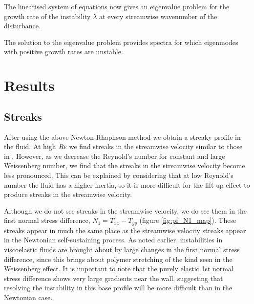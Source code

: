 \documentclass{jfm}
\newcommand\Wi{\mbox{\textit{Wi}}}
\newcommand\Rey{\mbox{\textit{Re}}}  %
\begin{document}
The linearised system of equations now gives an eigenvalue problem for the growth rate of the instability $\lambda$ at every streamwise wavenumber of the disturbance.

The solution to the eigenvalue problem provides spectra for which eigenmodes with positive growth rates are unstable.

\section{Results}

\subsection{Streaks}

After using the above Newton-Rhaphson method we obtain a streaky profile in the fluid. At high $\Rey$ we find streaks in the streamwise velocity similar to those in \cite{Waleffe1997}. However, as we decrease the Reynold's number for constant and large Weissenberg number, we find that the streaks in the streamwise velocity become less pronounced. This can be explained by considering that at low Reynold's number the fluid has a higher inertia, so it is more difficult for the lift up effect to produce streaks in the streamwise velocity. 

Although we do not see streaks in the streamwise velocity, we do see them in the first normal stress difference, $N_{1} = T_{xx} - T_{yy}$ (figure \ref{fig:pf_N1_map}). These streaks appear in much the same place as the streamwise velocity streaks appear in the Newtonian self-sustaining process. As noted earlier, instabilities in viscoelastic fluids are brought about by large changes in the first normal stress difference, since this brings about polymer stretching of the kind seen in the Weissenberg effect. It is important to note that the purely elastic 1st normal stress difference shows very large gradients near the wall, suggesting that resolving the instability in this base profile will be more difficult than in the Newtonian case.

\end{document}
